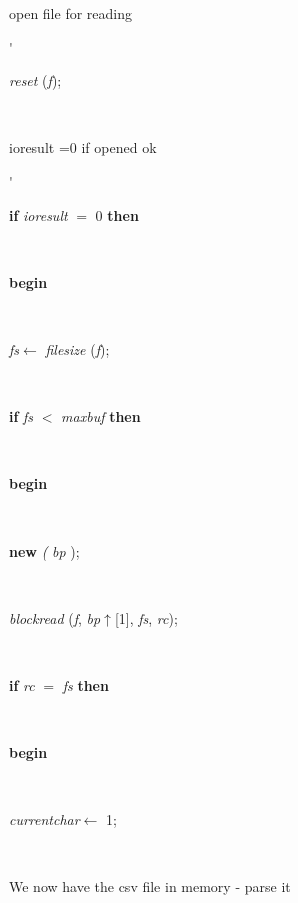 \begin{tabbing}
\<\parbox{3.5cm}{\scriptsize{open file for reading}}\'\>\parbox{14cm}{\textsf{\textit{reset} (\textit{f})}; }\\
\+\<\parbox{3.5cm}{\scriptsize{ioresult =0 if opened ok}}\'\>\parbox{14cm}{\textsf {\textbf {if } \textsf{\textit{ioresult} $=$ 0} \textbf{ then } }}\\
\<\parbox{14cm}{\textsf{\textbf{begin} }}\\
\parbox{14cm}{\textsf{\textit{fs}$\leftarrow$ \textit{filesize} (\textit{f})}; }\\
\+\parbox{14cm}{\textsf {\textbf {if } \textsf{\textit{fs} $<$ \textit{maxbuf}} \textbf{ then } }}\\
\<\parbox{14cm}{\textsf{\textbf{begin} }}\\
\parbox{14cm}{\textsf{\textbf{new} \textit{(} \textit{bp} );}}\\
\parbox{14cm}{\textsf{\textit{blockread} (\textit{f}, \textit{bp}$\uparrow$\textit{}[1], \textit{fs}, \textit{rc})}; }\\
\+\parbox{14cm}{\textsf {\textbf {if } \textsf{\textit{rc} $=$ \textit{fs}} \textbf{ then } }}\\
\<\parbox{14cm}{\textsf{\textbf{begin} }}\\
\parbox{14cm}{\textsf{\textit{currentchar}$\leftarrow$ 1}; }\\
\end{tabbing}
We now have the csv file in memory - parse it
